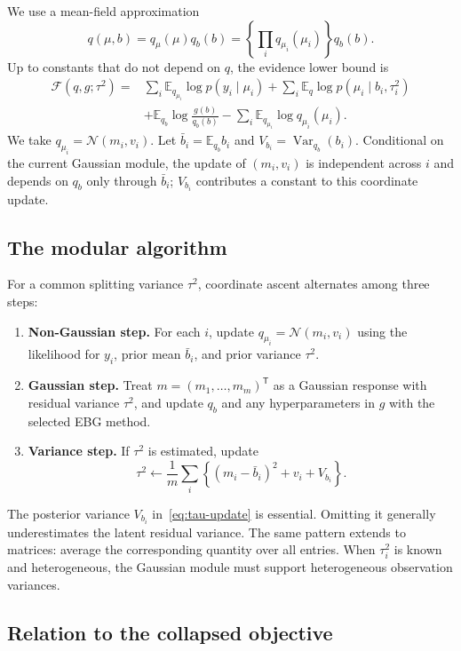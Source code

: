 \documentclass[11pt]{article}
\newcommand{\E}{\mathbb{E}}
\newcommand{\V}{\operatorname{Var}}
\newcommand{\N}{\mathcal{N}}
\begin{document}
We use a mean-field approximation
\[
 q(\mu,b)=q_\mu(\mu)q_b(b)
 =\left\{\prod_i q_{\mu_i}(\mu_i)\right\}q_b(b).
\]
Up to constants that do not depend on $q$, the evidence lower bound is
\begin{align}
 \mathcal{F}(q,g;\tau^2)
  ={}&\sum_i\E_{q_{\mu_i}}\log p(y_i\mid\mu_i)
   +\sum_i\E_q\log p(\mu_i\mid b_i,\tau_i^2) \nonumber\\
  &+\E_{q_b}\log\frac{g(b)}{q_b(b)}
   -\sum_i\E_{q_{\mu_i}}\log q_{\mu_i}(\mu_i).
 \label{eq:split-elbo}
\end{align}
We take $q_{\mu_i}=\N(m_i,v_i)$. Let
$\bar b_i=\E_{q_b}b_i$ and $V_{b_i}=\V_{q_b}(b_i)$. Conditional on the
current Gaussian module, the update of $(m_i,v_i)$ is independent across
$i$ and depends on $q_b$ only through $\bar b_i$; $V_{b_i}$ contributes a
constant to this coordinate update.

\subsection{The modular algorithm}

For a common splitting variance $\tau^2$, coordinate ascent alternates among
three steps:

\begin{enumerate}
\item \textbf{Non-Gaussian step.} For each $i$, update
  $q_{\mu_i}=\N(m_i,v_i)$ using the likelihood for $y_i$, prior mean
  $\bar b_i$, and prior variance $\tau^2$.
\item \textbf{Gaussian step.} Treat $m=(m_1,\ldots,m_m)^\mathsf{T}$ as a
  Gaussian response with residual variance $\tau^2$, and update $q_b$ and
  any hyperparameters in $g$ with the selected EBG method.
\item \textbf{Variance step.} If $\tau^2$ is estimated, update
\begin{equation}
 \tau^2\leftarrow \frac{1}{m}\sum_i
 \left\{(m_i-\bar b_i)^2+v_i+V_{b_i}\right\}.
 \label{eq:tau-update}
\end{equation}
\end{enumerate}

The posterior variance $V_{b_i}$ in~\eqref{eq:tau-update} is essential. Omitting
it generally underestimates the latent residual variance. The same pattern
extends to matrices: average the corresponding quantity over all entries.
When $\tau_i^2$ is known and heterogeneous, the Gaussian module must support
heterogeneous observation variances.

\subsection{Relation to the collapsed objective}
\end{document}
